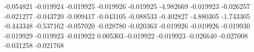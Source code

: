 -0.054821
-0.019924
-0.019925
-0.019926
-0.019925
-4.982669
-0.019923
-0.026257
-0.021277
-0.043720
-0.009417
-0.043105
-0.088533
-0.402827
-4.880305
-1.743305
-0.443348
-0.537162
-0.057020
-0.028780
-0.020363
-0.019926
-0.019926
-0.019930
-0.019929
-0.019923
-0.019922
0.005303
-0.019922
-0.019923
-0.026640
-0.027008
-0.031258
-0.021768
